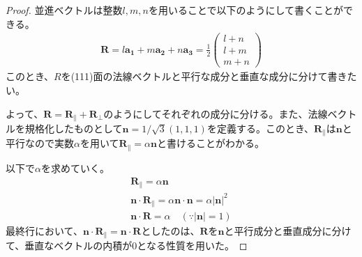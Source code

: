 \documentclass[a4paper,11pt,dvipdfmx]{jsarticle}
\begin{document}
\begin{enumerate}
\begin{itemize}
\begin{proof}
      並進ベクトルは整数$l, m, n$を用いることで以下のようにして書くことができる。
      \begin{align*}
        \boldsymbol{R} = l \boldsymbol{a_1} + m \boldsymbol{a_2} + n \boldsymbol{a_3} = \frac{1}{2}
        \begin{pmatrix}
          l + n \\
          l + m \\
          m + n
        \end{pmatrix}
      \end{align*}
      このとき、$R$を(111)面の法線ベクトルと平行な成分と垂直な成分に分けて書きたい。

      よって、$\boldsymbol{R} = \boldsymbol{R}_{\parallel} + \boldsymbol{R}_{\perp}$のようにしてそれぞれの成分に分ける。また、法線ベクトルを規格化したものとして$\boldsymbol{n} = 1 / \sqrt{3} (1, 1, 1)$を定義する。このとき、$\boldsymbol{R}_{\parallel}$は$\boldsymbol{n}$と平行なので実数$\alpha$を用いて$\boldsymbol{R}_{\parallel} = \alpha \boldsymbol{n}$と書けることがわかる。

      以下で$\alpha$を求めていく。
      \begin{gather*}
        \boldsymbol{R}_{\parallel} = \alpha \boldsymbol{n} \\
        \boldsymbol{n} \cdot \boldsymbol{R}_{\parallel} = \alpha \boldsymbol{n} \cdot \boldsymbol{n} = \alpha |\boldsymbol{n}|^2  \\
        \boldsymbol{n} \cdot \boldsymbol{R} = \alpha \quad ( \because |\boldsymbol{n}| = 1 )
      \end{gather*}
      最終行において、$\boldsymbol{n} \cdot \boldsymbol{R}_{\parallel} = \boldsymbol{n} \cdot \boldsymbol{R}$としたのは、$\boldsymbol{R}$を$\boldsymbol{n}$と平行成分と垂直成分に分けて、垂直なベクトルの内積が0となる性質を用いた。


\end{proof}
\end{itemize}
\end{enumerate}
\end{document}

